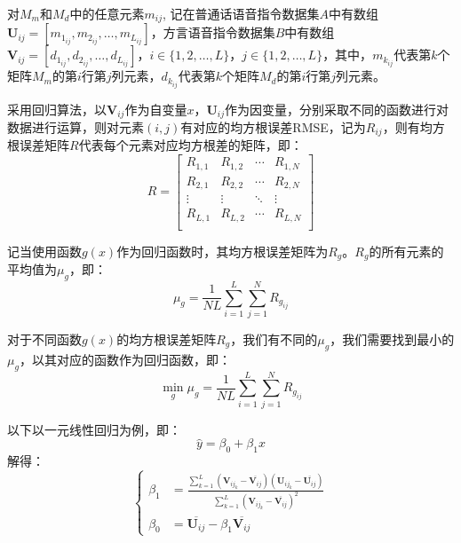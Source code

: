 \documentclass[lang=cn,cite=super]{elegantpaper}
\begin{document}
对$M_m$和$M_d$中的任意元素$m_{ij}$, 记在普通话语音指令数据集$A$中有数组$\mathbf{U}_{ij} = [m_{1_{ij}}, m_{2_{ij}}, \ldots, m_{L_{ij}}]$，方言语音指令数据集$B$中有数组$\mathbf{V}_{ij} = [d_{1_{ij}}, d_{2_{ij}}, \ldots, d_{L_{ij}}]$，$i \in \{ 1, 2, \ldots, L\}$，$j \in \{ 1, 2, \ldots, L\}$，其中，$m_{k_{ij}}$代表第$k$个矩阵$M_m$的第$i$行第$j$列元素，$d_{k_{ij}}$代表第$k$个矩阵$M_d$的第$i$行第$j$列元素。

采用回归算法，以$\mathbf{V}_{ij}$作为自变量$x$，$\mathbf{U}_{ij}$作为因变量，分别采取不同的函数进行对数据进行运算，则对元素$(i,j)$有对应的均方根误差RMSE，记为$R_{ij}$，则有均方根误差矩阵$R$代表每个元素对应均方根差的矩阵，即：
\begin{equation}
    R = \begin{bmatrix}
        R_{1,1} & R_{1,2} & \cdots & R_{1,N}\\
        R_{2,1} & R_{2,2} & \cdots & R_{2,N}\\
        \vdots & \vdots & \ddots & \vdots\\
        R_{L,1} & R_{L,2} & \cdots & R_{L,N}\\
    \end{bmatrix}
\end{equation}

记当使用函数$g(x)$作为回归函数时，其均方根误差矩阵为$R_g$。$R_g$的所有元素的平均值为$\mu_g$，即：
\begin{equation}
    \mu_g = \frac{1}{NL}\sum_{i=1}^{L} \sum_{j=1}^{N} R_{g_{ij}}
\end{equation}

对于不同函数$g(x)$的均方根误差矩阵$R_g$，我们有不同的$\mu_g$，我们需要找到最小的$\mu_g$，以其对应的函数作为回归函数，即：
\begin{equation}
    \mathop{\min}_{g} \mu_g = \frac{1}{NL}\sum_{i=1}^{L} \sum_{j=1}^{N} R_{g_{ij}}
\end{equation}

以下以一元线性回归为例，即：
\begin{equation}
    \hat{y} = \beta_0 + \beta_1 x
\end{equation}
解得：
\begin{equation}
    \left\{ 
    \begin{aligned}
           \beta_1 &= \frac{\sum_{k=1}^{L} (\mathbf{V}_{{ij}_k}-\overline{\mathbf{V}_{ij}}) (\mathbf{U}_{{ij}_k}-\overline{\mathbf{U}_{ij}})}{\sum_{k=1}^{L} (\mathbf{V}_{{ij}_k}-\overline{\mathbf{V}_{ij}})^2}\\
        \beta_0 &= \overline{\mathbf{U}_{ij}}-\beta_1 \overline{\mathbf{V}_{ij}}
    \end{aligned}
    \right.
\end{equation}
\end{document}
